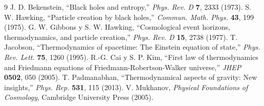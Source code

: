 \documentclass[12pt,a4paper]{article}
\begin{document}
\begin{thebibliography}{9}
 J. D. Bekenstein, ``Black holes and entropy,'' \textit{Phys. Rev. D} \textbf{7}, 2333 (1973).
 S. W. Hawking, ``Particle creation by black holes,'' \textit{Commun. Math. Phys.} \textbf{43}, 199 (1975).
 G. W. Gibbons y S. W. Hawking, ``Cosmological event horizons, thermodynamics, and particle creation,'' \textit{Phys. Rev. D} \textbf{15}, 2738 (1977).
 T. Jacobson, ``Thermodynamics of spacetime: The Einstein equation of state,'' \textit{Phys. Rev. Lett.} \textbf{75}, 1260 (1995).
 R.-G. Cai y S. P. Kim, ``First law of thermodynamics and Friedmann equations of Friedmann-Robertson-Walker universe,'' \textit{JHEP} \textbf{0502}, 050 (2005).
 T. Padmanabhan, ``Thermodynamical aspects of gravity: New insights,'' \textit{Phys. Rep.} \textbf{531}, 115 (2013).
 V. Mukhanov, \textit{Physical Foundations of Cosmology}, Cambridge University Press (2005).
\end{thebibliography}
\end{document}
